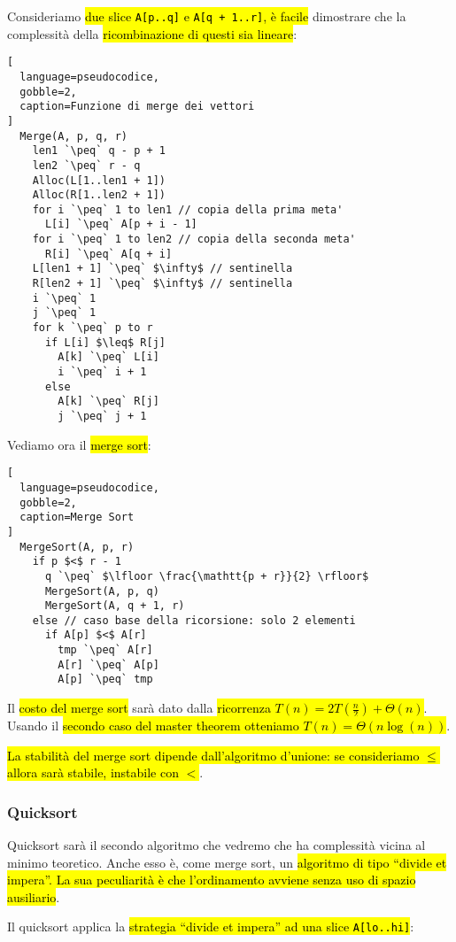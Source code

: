\documentclass[a4paper,11pt,oneside]{article}
\theoremstyle{plain}
\theoremstyle{definition}
\theoremstyle{remark}
\newcommand{\peq}{$\gets$}
\begin{document}
Consideriamo \hl{due slice \texttt{A[p..q]} e \texttt{A[q + 1..r]}, è facile}
dimostrare che la complessità della \hl{ricombinazione di questi sia lineare}:

\begin{lstlisting}[
  language=pseudocodice,
  gobble=2,
  caption=Funzione di merge dei vettori
]
  Merge(A, p, q, r)
    len1 `\peq` q - p + 1
    len2 `\peq` r - q
    Alloc(L[1..len1 + 1])
    Alloc(R[1..len2 + 1])
    for i `\peq` 1 to len1 // copia della prima meta'
      L[i] `\peq` A[p + i - 1]
    for i `\peq` 1 to len2 // copia della seconda meta'
      R[i] `\peq` A[q + i]
    L[len1 + 1] `\peq` $\infty$ // sentinella
    R[len2 + 1] `\peq` $\infty$ // sentinella
    i `\peq` 1
    j `\peq` 1
    for k `\peq` p to r
      if L[i] $\leq$ R[j]
        A[k] `\peq` L[i]
        i `\peq` i + 1
      else
        A[k] `\peq` R[j]
        j `\peq` j + 1
\end{lstlisting}

Vediamo ora il \hl{merge sort}:

\begin{lstlisting}[
  language=pseudocodice,
  gobble=2,
  caption=Merge Sort
]
  MergeSort(A, p, r)
    if p $<$ r - 1
      q `\peq` $\lfloor \frac{\mathtt{p + r}}{2} \rfloor$
      MergeSort(A, p, q)
      MergeSort(A, q + 1, r)
    else // caso base della ricorsione: solo 2 elementi
      if A[p] $<$ A[r]
        tmp `\peq` A[r]
        A[r] `\peq` A[p]
        A[p] `\peq` tmp
\end{lstlisting}

Il \hl{costo del merge sort} sarà dato dalla \hl{ricorrenza $T(n) =
2T(\frac{n}{2}) + \Theta(n)$}. Usando il \hl{secondo caso del master theorem
otteniamo $T(n) = \Theta(n\log(n))$}.

\hl{La stabilità del merge sort dipende dall'algoritmo d'unione: se consideriamo
$\leq$ allora sarà stabile, instabile con $<$}.

\subsubsection{Quicksort}\label{sec:quicksort}

Quicksort sarà il secondo algoritmo che vedremo che ha complessità vicina al
minimo teoretico. Anche esso è, come merge sort, un\hl{ algoritmo di tipo
``divide et impera''. La sua peculiarità è che l'ordinamento avviene senza uso
di spazio ausiliario}.

Il quicksort applica la \hl{strategia ``divide et impera'' ad una slice
\texttt{A[lo..hi]}}:
\end{document}
